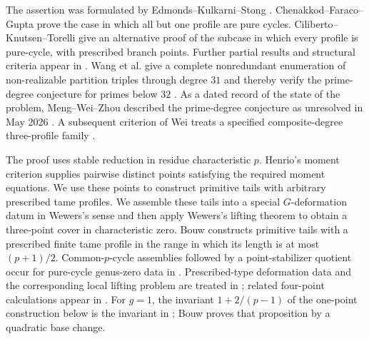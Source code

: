 \documentclass[11pt]{amsart}
\theoremstyle{plain}
\theoremstyle{definition}
\numberwithin{equation}{section}
\begin{document}
The assertion was formulated by Edmonds--Kulkarni--Stong
\cite[p.~787]{EKS}.  Chenakkod--Faraco--Gupta
\cite[Corollary~9.6]{ChenakkodFaracoGupta} prove the case in which all but
one profile are pure cycles.  Ciliberto--Knutsen--Torelli
\cite[Theorem~0.1]{CilibertoKnutsenTorelli} give an alternative proof of the
subcase in which every profile is pure-cycle, with prescribed branch points.
Further partial results and structural criteria appear in
\cite{PascaliPetronio,BaroniPetronio,PakovichFiber,WeiRational}.
Wang et al. give a complete nonredundant enumeration of non-realizable
partition triples through degree $31$ and thereby verify the prime-degree
conjecture for primes below $32$ \cite{WangComputational}.  As a dated record
of the state of the problem, Meng--Wei--Zhou described the prime-degree
conjecture as unresolved in May 2026 \cite[Introduction]{MengWeiZhou}.  A
subsequent criterion of Wei treats a specified composite-degree
three-profile family \cite{WeiThreeBranch}.

The proof uses stable reduction in residue characteristic $p$.  Henrio's
moment criterion
\cite[Definition~3.14 and Proposition~3.16(b)]{Henrio} supplies pairwise
distinct points satisfying the required moment equations.  We use these
points to construct primitive tails with arbitrary prescribed tame profiles.
We assemble these tails into a special $G$-deformation datum in Wewers's
sense and then apply Wewers's lifting theorem
\cite{WewersMeta,WewersThree} to obtain a three-point cover in
characteristic zero.  Bouw
\cite[Section~3, especially the construction preceding Lemma~3.2 and
Lemma~3.2]{BouwAffine} constructs primitive tails with a prescribed finite
tame profile in the range in which its length is at most $(p+1)/2$.
Common-$p$-cycle assemblies followed by a point-stabilizer quotient occur
for pure-cycle genus-zero data in
\cite[Construction~4.2.3 and Propositions~4.2.4--4.2.5]{Eskin}.
Prescribed-type deformation data and the corresponding local lifting
problem are treated in \cite{BouwWewersZapponi}; related four-point
calculations appear in \cite{BouwOsserman}.  For $g=1$, the invariant
$1+2/(p-1)$ of the one-point construction below is the invariant in
\cite[Proposition~3.3]{BouwAffine}; Bouw proves that proposition by a
quadratic base change.
\end{document}
